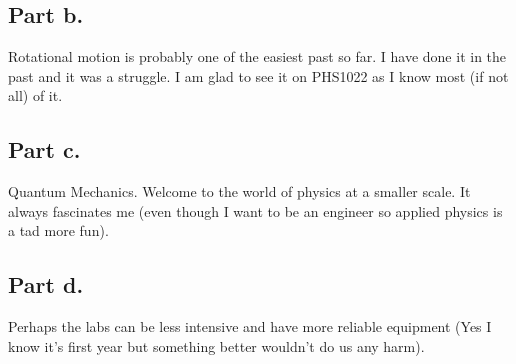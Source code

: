\documentclass[10pt]{article}
\begin{document}
\subsection{Part b.}
Rotational motion is probably one of the easiest past so far. I have done it in the past and it was a struggle. I am glad to see it on PHS1022 as I know most (if not all) of it.
\subsection{Part c.}
Quantum Mechanics. Welcome to the world of physics at a smaller scale. It always fascinates me (even though I want to be an engineer so applied physics is a tad more fun).
\subsection{Part d.}
Perhaps the labs can be less intensive and have more reliable equipment (Yes I know it's first year but something better wouldn't do us any harm). 
\end{document}
